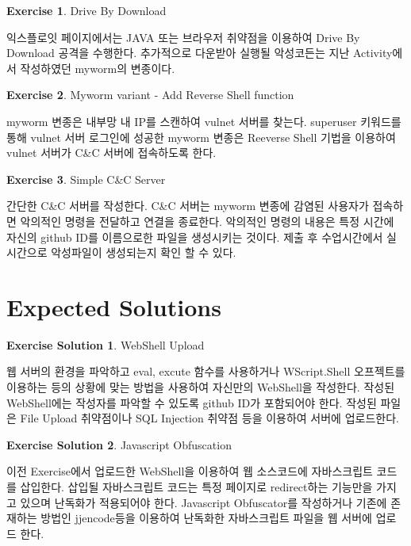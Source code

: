 \documentclass[a4paper, 11pt]{article}
\theoremstyle{definition}
\newtheorem{exercise}{Exercise}
\newtheorem{exercise solution}{Exercise Solution}
\begin{document}
\begin{exercise}
	Drive By Download
	
	익스플로잇 페이지에서는 JAVA 또는 브라우저 취약점을 이용하여 Drive By Download 공격을 수행한다. 추가적으로 다운받아 실행될 악성코든는 지난 Activity에서 작성하였던 myworm의 변종이다. 
\end{exercise}

\begin{exercise}
	Myworm variant - Add Reverse Shell function
	
	myworm 변종은 내부망 내 IP를 스캔하여 vulnet 서버를 찾는다. superuser 키워드를 통해 vulnet 서버 로그인에 성공한 myworm 변종은 Reeverse Shell 기법을 이용하여 vulnet 서버가 C\&C 서버에 접속하도록 한다.
\end{exercise}

\begin{exercise}
	Simple C\&C Server
	  
	간단한 C\&C 서버를 작성한다. C\&C 서버는 myworm 변종에 감염된 사용자가 접속하면 악의적인 명령을 전달하고 연결을 종료한다. 악의적인 명령의 내용은 특정 시간에 자신의 github ID를 이름으로한 파일을 생성시키는 것이다. 제출 후 수업시간에서 실시간으로 악성파일이 생성되는지 확인 할 수 있다.
\end{exercise}

\section{Expected Solutions}

\begin{exercise solution}
	WebShell Upload
	
	웹 서버의 환경을 파악하고 eval, excute 함수를 사용하거나 WScript.Shell 오프젝트를 이용하는 등의 상황에 맞는 방법을 사용하여 자신만의 WebShell을 작성한다. 작성된 WebShell에는 작성자를 파악할 수 있도록 github ID가 포함되어야 한다. 작성된 파일은 File Upload 취약점이나 SQL Injection 취약점 등을 이용하여 서버에 업로드한다.
\end{exercise solution}

\begin{exercise solution}
	Javascript Obfuscation
	
	이전 Exercise에서 업로드한 WebShell을 이용하여 웹 소스코드에 자바스크립트 코드를 삽입한다. 삽입될 자바스크립트 코드는 특정 페이지로 redirect하는 기능만을 가지고 있으며 난독화가 적용되어야 한다. Javascript Obfuscator를 작성하거나 기존에 존재하는 방법인 jjencode\cite{jjencode}등을 이용하여 난독화한 자바스크립트 파일을 웹 서버에 업로드 한다.
	
\end{exercise solution}
\end{document}

